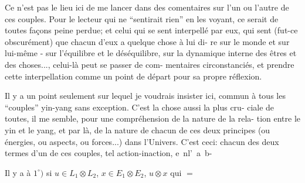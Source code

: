Ce n'est pas le lieu ici de me lancer dans des comentaires sur l'un ou
l'autre de ces couples. Pour le lecteur qui ne ``sentirait rien'' en les voyant,
ce serait de toutes façons peine perdue; et celui qui se sent interpellé par
eux, qui sent (fut-ce obscurément) que chacun d'eux a quelque chose à lui di-
re sur le monde et sur lui-même - sur l'équilibre et le déséquilibre, sur la
dynamique interne des êtres et des choses..., celui-là peut se passer de com-
mentaires circonstanciés, et prendre cette interpellation comme un point de
départ pour sa propre réflexion.

Il y a un point seulement sur lequel je voudrais insister ici, commun à
tous les ``couples'' yin-yang sans exception. C'est la chose aussi la plus cru-
ciale de toutes, il me semble, pour une compréhension de la nature de la rela-
tion entre le yin et le yang, et par là, de la nature de chacun de ces deux
principes (ou énergies, ou aspects, ou forces...) dans l'Univers. C'est ceci:
chacun des deux termes d'un de ces couples, tel action-inaction, \mbox{e n\quad l' a b-}
\margin{\unsure{-}}

 
Il y a à   
$1^\circ)$ si $u\in L_1\otimes L_2$, $x\in E_1\otimes E_2$,  $u\otimes x$ 
qui  $=$ 

